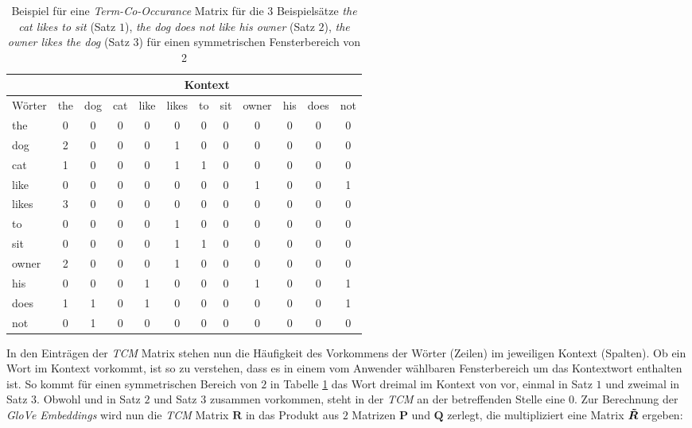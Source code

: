 \documentclass[a4paper,11pt]{article}
\begin{document}
\begin{table}[ht]
\begin{center}
  
 \begin{tabular}{|l||ccccccccccc|}
  \hline
  & \multicolumn{11}{|c|}{Kontext} \\
\hline 
Wörter & the & dog & cat & like & likes & to & sit & owner & his & does & not \\ 
  \hline
the & 0 & 0 & 0 & 0 & 0 & 0 & 0 & 0 & 0 & 0 & 0 \\ 
  dog & 2  & 0  & 0  & 0  & 1 & 0 & 0 & 0 & 0 & 0 & 0 \\ 
  cat & 1 & 0 & 0 & 0 & 1 & 1 & 0 & 0 & 0 & 0 & 0 \\ 
  like & 0 & 0 & 0 & 0 & 0 & 0 & 0 & 1 & 0 & 0 & 1 \\ 
  likes & 3 & 0 & 0 & 0 & 0 & 0 & 0 & 0 & 0 & 0 & 0 \\ 
  to & 0 & 0 & 0 & 0 & 1 & 0 & 0 & 0 & 0 & 0 & 0 \\ 
  sit & 0 & 0 & 0 & 0 & 1 & 1 & 0 & 0 & 0 & 0 & 0 \\ 
  owner & 2 & 0 & 0 & 0 & 1 & 0 & 0 & 0 & 0 & 0 & 0 \\ 
  his & 0 & 0 & 0 & 1 & 0 & 0 & 0 & 1 & 0 & 0 & 1 \\ 
  does & 1 & 1 & 0 & 1 & 0 & 0 & 0 & 0 & 0 & 0 & 1 \\ 
  not & 0 & 1 & 0 & 0 & 0 & 0 & 0 & 0 & 0 & 0 & 0 \\ 
   \hline
\end{tabular}  
 
\end{center}{}
\caption{Beispiel für eine \textit{Term-Co-Occurance} Matrix für die $3$ Beispielsätze \textit{the cat likes to sit} (Satz $1$), \textit{the dog does not like his owner} (Satz $2$), \textit{the owner likes the dog} (Satz $3$) für einen symmetrischen Fensterbereich von 2}  
\label{tab:GloveExample}

\end{table}

In den Einträgen der \textit{TCM} Matrix stehen nun die Häufigkeit des Vorkommens der Wörter (Zeilen) im jeweiligen Kontext (Spalten). Ob ein Wort im Kontext vorkommt, ist so zu verstehen, dass es in einem vom Anwender wählbaren Fensterbereich um das Kontextwort enthalten ist. So kommt für einen symmetrischen Bereich von $2$ in Tabelle \ref{tab:GloveExample} das Wort  dreimal im Kontext von  vor, einmal in Satz $1$ und zweimal in Satz $3$. Obwohl  und  in Satz $2$ und Satz $3$ zusammen vorkommen, steht in der \textit{TCM} an der betreffenden Stelle eine $0$. Zur Berechnung der \textit{GloVe Embeddings} wird nun die \textit{TCM} Matrix $\bm{R}$ in das Produkt aus $2$ Matrizen $\bm{P}$ und $\bm{Q}$ zerlegt, die multipliziert eine Matrix $\bm{\Tilde{R}}$ ergeben:
\end{document}
